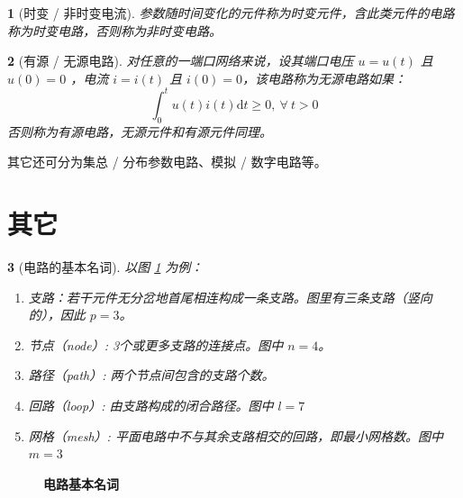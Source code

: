 \documentclass[UTF8]{report}
\theoremstyle{MyLineTheoremStyle} %
\theoremstyle{MyBlockTheoremStyle} %
\theoremstyle{MySubsubsectionStyle} %
\newtheorem{definition}{}
\begin{document}
\begin{definition}[时变 / 非时变电流]
参数随时间变化的元件称为时变元件，含此类元件的电路称为时变电路，否则称为非时变电路。
\end{definition}


\begin{definition}[有源 / 无源电路]
对任意的一端口网络来说，设其端口电压 $u = u(t)$ 且 $u(0) = 0$ ，电流 $i = i(t)$ 且 $i(0) = 0$，该电路称为无源电路如果：
\begin{equation}
\int_{0}^{t} u(t)i(t)\mathrm{d}t \geqslant 0,\ \forall\ t >0
\end{equation}
否则称为有源电路，无源元件和有源元件同理。
\end{definition}


其它还可分为集总 / 分布参数电路、模拟 / 数字电路等。

\section{其它}




\begin{center}\noindent\begin{minipage}{0.65\textwidth}
    \begin{definition}[电路的基本名词]
    以图 \ref{电路基本名词} 为例：
    \begin{enumerate}
    \item 支路：若干元件无分岔地首尾相连构成一条支路。图里有三条支路（竖向的），因此 $p = 3$。
    \item 节点（node）: 3个或更多支路的连接点。图中 $n = 4$。 
    \item 路径（path）: 两个节点间包含的支路个数。
    \item 回路（loop）: 由支路构成的闭合路径。图中 $l = 7$
    \item 网格（mesh）: 平面电路中不与其余支路相交的回路，即最小网格数。图中 $m = 3$
    \end{enumerate}
    \end{definition}
\end{minipage}\hfill\begin{minipage}{0.35\textwidth}
    \begin{figure}[H]\centering
        
        \caption{\textbf{电路基本名词}}\label{电路基本名词}
    \end{figure}
\end{minipage}\end{center}
\end{document}
